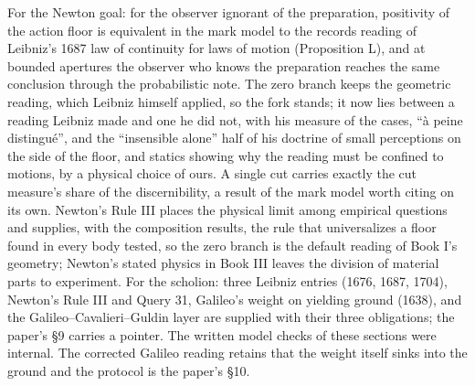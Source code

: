 \documentclass[11pt,a4paper]{article}
\begin{document}
For the Newton goal: for the observer ignorant of the preparation,
positivity of the action floor is equivalent in the mark model to the
records reading of Leibniz's 1687 law of continuity for laws of motion
(Proposition L), and at bounded apertures the observer who knows the
preparation reaches the same conclusion through the probabilistic note.
The zero branch keeps the geometric reading, which Leibniz himself
applied, so the fork stands; it now lies between a reading Leibniz made
and one he did not, with his measure of the cases, ``à peine
distingué'', and the ``insensible alone'' half of his doctrine of small
perceptions on the side of the floor, and statics showing why the
reading must be confined to motions, by a physical choice of ours. A
single cut carries exactly the cut measure's share of the
discernibility, a result of the mark model worth citing on its own.
Newton's Rule III places the physical limit among empirical questions
and supplies, with the composition results, the rule that universalizes
a floor found in every body tested, so the zero branch is the default
reading of Book I's geometry; Newton's stated physics in Book III leaves
the division of material parts to experiment. For the scholion: three
Leibniz entries (1676, 1687, 1704), Newton's Rule III and Query 31,
Galileo's weight on yielding ground (1638), and the
Galileo--Cavalieri--Guldin layer are supplied with their three
obligations; the paper's §9 carries a pointer. The written model checks
of these sections were internal. The corrected Galileo reading retains
that the weight itself sinks into the ground and the protocol is the
paper's §10.
\end{document}

